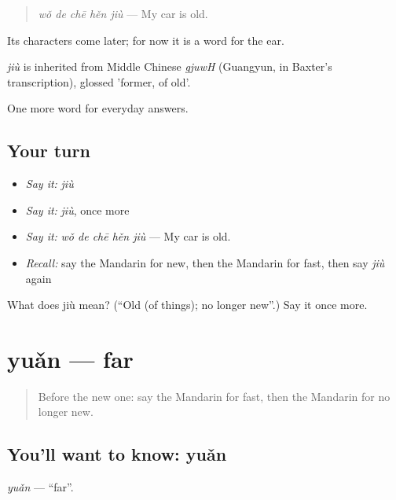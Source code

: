 \begin{quote}
\emph{wǒ de chē hěn jiù} — My car is old.
\end{quote}

Its characters come later; for now it is a word for the ear.

\begin{cousinweb}
\emph{jiù} is inherited from Middle Chinese \emph{gjuwH} (Guangyun, in Baxter's transcription), glossed 'former, of old'.
\end{cousinweb}

\begin{grammarlens}[title={What you've built}]
One more word for everyday answers.
\end{grammarlens}

\subsection*{Your turn}
\begin{itemize}
\raggedright
  \item \emph{Say it:} \emph{jiù}
  \item \emph{Say it:} \emph{jiù}, once more
  \item \emph{Say it:} \emph{wǒ de chē hěn jiù} — My car is old.
  \item \emph{Recall:} say the Mandarin for new, then the Mandarin for fast, then say \emph{jiù} again
\end{itemize}

\begin{tcolorbox}[breakable,colback=teal!4,colframe=teal!35!black,title={Before you move on}]
What does jiù mean? (\textquotedblleft{}Old (of things); no longer new\textquotedblright{}.) Say it once more.
\end{tcolorbox}
\section[yuǎn]{yuǎn — far}

\label{lesson:ZH-C62-yuan}



\begin{quote}
Before the new one: say the Mandarin for fast, then the Mandarin for no longer new.
\end{quote}

\subsection*{You'll want to know: yuǎn}
\emph{yuǎn} — \textquotedblleft{}far\textquotedblright{}.

